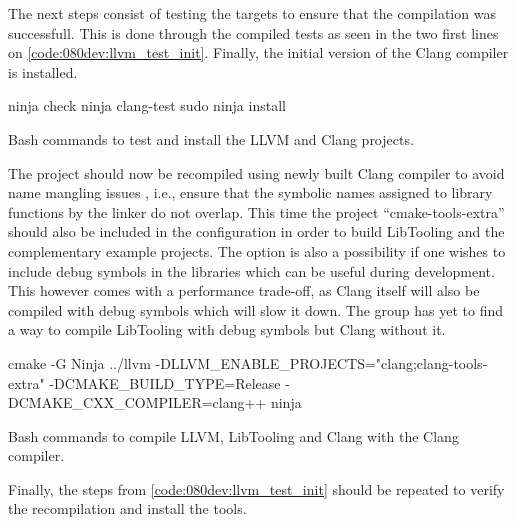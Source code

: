 The next steps consist of testing the targets to ensure that the compilation was successfull. This is done through the compiled tests as seen in the two first lines on \cref{code:080dev:llvm_test_init}. Finally, the initial version of the Clang compiler is installed.

\begin{listing}[H]
    \begin{bashcode}
ninja check
ninja clang-test
sudo ninja install
    \end{bashcode}
    \caption{Bash commands to test and install the LLVM and Clang projects.}
    \label{code:080dev:llvm_test_init}
\end{listing}

The project should now be recompiled using newly built Clang compiler to avoid name mangling issues \cite{ibmIBMDocumentation2021}, i.e., ensure that the symbolic names assigned to library functions by the linker do not overlap. This time the project ``cmake-tools-extra'' should also be included in the configuration in order to build LibTooling and the complementary example projects.
The option  is also a possibility if one wishes to include debug symbols in the libraries which can be useful during development. This however comes with a performance trade-off, as Clang itself will also be compiled with debug symbols which will slow it down.
The group has yet to find a way to compile LibTooling with debug symbols but Clang without it.

\begin{listing}[H]
    \begin{bashcode}
cmake -G Ninja ../llvm -DLLVM_ENABLE_PROJECTS="clang;clang-tools-extra" -DCMAKE_BUILD_TYPE=Release -DCMAKE_CXX_COMPILER=clang++
ninja
    \end{bashcode}
    \caption{Bash commands to compile LLVM, LibTooling and Clang with the Clang compiler.}
    \label{code:080dev:llvm_compile_final}
\end{listing}

Finally, the steps from \cref{code:080dev:llvm_test_init} should be repeated to verify the recompilation and install the tools.